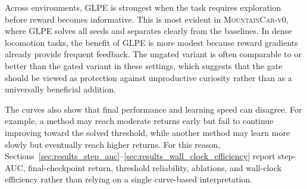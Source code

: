 Across environments, GLPE is strongest when the task requires exploration before reward becomes informative.
This is most evident in \textsc{MountainCar-v0}, where GLPE solves all seeds and separates clearly from the baselines.
In dense locomotion tasks, the benefit of GLPE is more modest because reward gradients already provide frequent feedback.
The ungated variant is often comparable to or better than the gated variant in these settings, which suggests that the gate should be viewed as protection against unproductive curiosity rather than as a universally beneficial addition.

The curves also show that final performance and learning speed can disagree.
For example, a method may reach moderate returns early but fail to continue improving toward the solved threshold, while another method may learn more slowly but eventually reach higher returns.
For this reason, Sections~\ref{sec:results_step_auc}--\ref{sec:results_wall_clock_efficiency} report step-AUC, final-checkpoint return, threshold reliability, ablations, and wall-clock efficiency rather than relying on a single curve-based interpretation.

\FloatBarrier